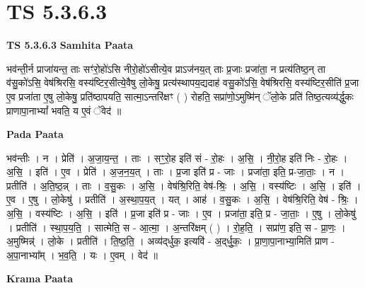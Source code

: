 \documentclass[17pt]{extarticle}
\begin{document}
\section{ TS 5.3.6.3 }

\textbf{TS 5.3.6.3 } \newline
\textbf{Samhita Paata} \newline

भव॑न्ती॒र्न प्राजा॑यन्त॒ ताः सꣳ॑रो॒हो॑ऽसि नीरो॒हो॑ऽसीत्ये॒व प्राऽज॑नय॒त् ताः प्र॒जाः प्रजा॑ता॒ न प्रत्य॑तिष्ठ॒न् ता व॑सु॒को॑ऽसि॒ वेष॑श्रिरसि॒ वस्य॑ष्टिर॒सीत्ये॒वैषु लो॒केषु॒ प्रत्य॑स्थापय॒द्यदाह॑ वसु॒को॑ऽसि॒ वेष॑श्रिरसि॒ वस्य॑ष्टिर॒सीति॑ प्र॒जा ए॒व प्रजा॑ता ए॒षु लो॒केषु॒ प्रति॑ष्ठापयति॒ सात्मा॒ऽन्तरि॑क्षꣳ ( ) रोहति॒ सप्रा॑णो॒ऽमुष्मि॑न् ॅलो॒के प्रति॑ तिष्ठ॒त्यव्य॑र्द्धुकः प्राणापा॒नाभ्यां᳚ भवति॒ य ए॒वं ॅवेद॑ ॥ \newline

\textbf{Pada Paata} \newline

भव॑न्तीः । न । प्रेति॑ । अ॒जा॒य॒न्त॒ । ताः । सꣳ॒॒रो॒ह इति॑ सं - रो॒हः । अ॒सि॒ । नी॒रो॒ह इति॑ निः - रो॒हः । अ॒सि॒ । इति॑ । ए॒व । प्रेति॑ । अ॒ज॒न॒य॒त् । ताः । प्र॒जा इति॑ प्र - जाः । प्रजा॑ता॒ इति॒ प्र-जा॒ताः॒ । न । प्रतीति॑ । अ॒ति॒ष्ठ॒न्न् । ताः । व॒सु॒कः । अ॒सि॒ । वेष॑श्रि॒रिति॒ वेष॑-श्रिः॒ । अ॒सि॒ । वस्य॑ष्टिः । अ॒सि॒ । इति॑ । ए॒व । ए॒षु । लो॒केषु॑ । प्रतीति॑ । अ॒स्था॒प॒य॒त् । यत् । आह॑ । व॒सु॒कः । अ॒सि॒ । वेष॑श्रि॒रिति॒ वेष॑ - श्रिः॒ । अ॒सि॒ । वस्य॑ष्टिः । अ॒सि॒ । इति॑ । प्र॒जा इति॑ प्र - जाः । ए॒व । प्रजा॑ता॒ इति॒ प्र - जा॒ताः॒ । ए॒षु । लो॒केषु॑ । प्रतीति॑ । स्था॒प॒य॒ति॒ । सात्मेति॒ स - आ॒त्मा॒ । अ॒न्तरि॑क्षम् ( ) । रो॒ह॒ति॒ । सप्रा॑ण॒ इति॒ स - प्रा॒णः॒ । अ॒मुष्मिन्न्॑ । लो॒के । प्रतीति॑ । ति॒ष्ठ॒ति॒ । अव्य॑द्‌र्धुक॒ इत्यवि॑ - अ॒द्‌र्धु॒कः॒ । प्रा॒णा॒पा॒नाभ्या॒मिति॑ प्राण - अ॒पा॒नाभ्या᳚म् । भ॒व॒ति॒ । यः । ए॒वम् । वेद॑ ॥  \newline


\textbf{Krama Paata} \newline
\end{document}
